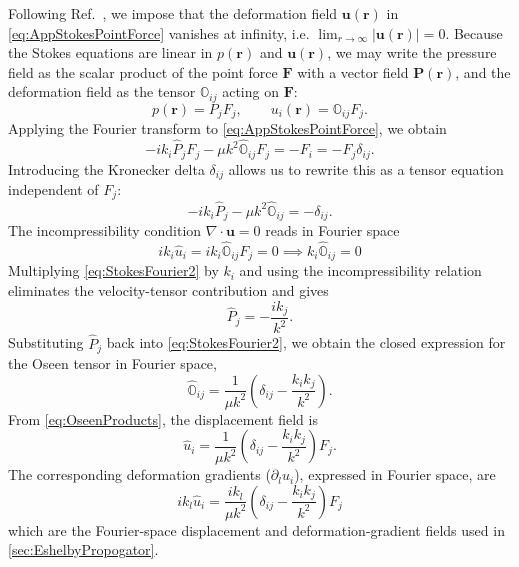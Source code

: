 \begin{subappendices}
Following Ref.~\cite{kim_microhydrodynamics_1991}, we impose that the deformation field $\bm{u}(\bm{r})$ in \cref{eq:AppStokesPointForce} vanishes at infinity, i.e. $\lim_{r \to \infty}|\bm{u}(\bm{r})| = 0$. Because the Stokes equations are linear in $p(\bm{r})$ and $\bm{u}(\bm{r})$, we may write the pressure field as the scalar product of the point force $\bm{F}$ with a vector field $\bm{P}(\bm{r})$, and the deformation field as the tensor $\mathbb{O}_{ij}$ acting on $\bm{F}$:
\begin{equation}
    p(\bm{r}) = P_j F_j, \qquad
    u_i(\bm{r}) = \mathbb{O}_{ij} F_j.
    \label{eq:OseenProducts}
\end{equation}
Applying the Fourier transform to \cref{eq:AppStokesPointForce}, we obtain
\begin{equation*}
- i k_i \hat{P}_j F_j 
- \mu k^2 \hat{\mathbb{O}}_{ij} F_j 
= -F_i = -F_j \delta_{ij}.
\end{equation*}
Introducing the Kronecker delta $\delta_{ij}$ allows us to rewrite this as a tensor equation independent of $F_j$:
\begin{equation}
    - i k_i \hat{P}_j 
    - \mu k^2 \hat{\mathbb{O}}_{ij} 
    = -\delta_{ij}.
    \label{eq:StokesFourier2}
\end{equation}
The incompressibility condition $\nabla \cdot \bm{u} = 0$ reads in Fourier space
\[
    ik_i\hat{u}_i=ik_i\hat{\mathbb{O}}_{ij} F_j=0 \implies k_i\hat{\mathbb{O}}_{ij} = 0
\]
Multiplying \cref{eq:StokesFourier2} by $k_i$ and using the incompressibility relation eliminates the velocity-tensor contribution and gives
\begin{equation*}
    \hat{P}_j = -\frac{ik_j}{k^2}.
\end{equation*}
Substituting $\hat{P}_j$ back into \cref{eq:StokesFourier2}, we obtain the closed expression for the Oseen tensor in Fourier space,
\begin{equation}
    \hat{\mathbb{O}}_{ij} = \frac{1}{\mu k^2}\left( \delta_{ij} - \frac{k_ik_j}{k^2} \right).
    \label{eq:AppOseenPointForce}
\end{equation}
From \cref{eq:OseenProducts}, the displacement field is
\begin{equation}
    \hat{u}_i = \frac{1}{\mu k^2}\left( \delta_{ij} - \frac{k_ik_j}{k^2} \right)F_j.
    \label{eq:AppFourierDeformationPointForce}
\end{equation}
The corresponding deformation gradients ($\partial_l u_i$), expressed in Fourier space, are
\begin{equation}
    ik_l\hat{u}_i = \frac{ik_l}{\mu k^2}\left( \delta_{ij} - \frac{k_ik_j}{k^2} \right)F_j
    \label{eq:AppFourierDeformationGradientPointForce}
\end{equation}
which are the Fourier-space displacement and deformation-gradient fields used in \cref{sec:EshelbyPropogator}.


\end{subappendices}
